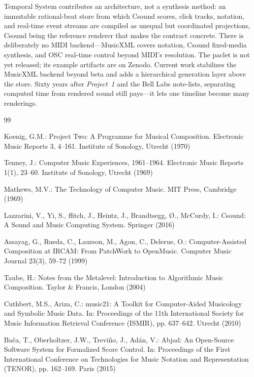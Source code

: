 \documentclass[runningheads,a4paper]{llncs}
\begin{document}
Temporal System contributes an architecture, not a synthesis method: an
immutable rational-beat store from which Csound scores, click tracks, notation,
and real-time event streams are compiled as unequal but coordinated projections,
Csound being the reference renderer that makes the contract concrete. There is
deliberately no MIDI backend---MusicXML covers notation, Csound fixed-media
synthesis, and OSC real-time control beyond MIDI's resolution. The paclet is
not yet released; its example artifacts are on Zenodo. Current
work stabilizes the MusicXML backend beyond beta and adds a hierarchical
generation layer above the store. Sixty years after \emph{Project~1} and the
Bell Labs note-lists, separating computed time from rendered sound still
pays---it lets one timeline become many renderings.

\begin{thebibliography}{99}

 Koenig, G.M.: Project Two: A Programme for Musical
Composition. Electronic Music Reports 3, 4--161. Institute of Sonology,
Utrecht (1970)

 Tenney, J.: Computer Music Experiences, 1961--1964.
Electronic Music Reports 1(1), 23--60. Institute of Sonology, Utrecht (1969)

 Mathews, M.V.: The Technology of Computer Music. MIT
Press, Cambridge (1969)

 Lazzarini, V., Yi, S., ffitch, J., Heintz, J.,
Brandtsegg, {\O}., McCurdy, I.: Csound: A Sound and Music Computing System.
Springer (2016)

 Assayag, G., Rueda, C., Laurson, M., Agon, C., Delerue,
O.: Computer-Assisted Composition at IRCAM: From PatchWork to OpenMusic.
Computer Music Journal 23(3), 59--72 (1999)

 Taube, H.: Notes from the Metalevel: Introduction to
Algorithmic Music Composition. Taylor \& Francis, London (2004)

 Cuthbert, M.S., Ariza, C.: music21: A Toolkit for
Computer-Aided Musicology and Symbolic Music Data. In: Proceedings of the
11th International Society for Music Information Retrieval Conference (ISMIR),
pp. 637--642. Utrecht (2010)

 Ba{\v c}a, T., Oberholtzer, J.W., Trevi{\~n}o, J.,
Ad{\'a}n, V.: Abjad: An Open-Source Software System for Formalized Score
Control. In: Proceedings of the First International Conference on
Technologies for Music Notation and Representation (TENOR), pp. 162--169.
Paris (2015)


\end{thebibliography}
\end{document}
